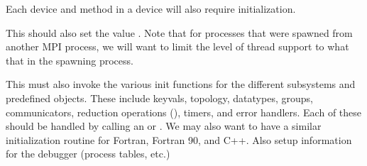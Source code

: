 \documentclass{article}
\begin{document}
Each device and method in a device will also require initialization.  


This should also set the value .
Note that for processes that were spawned from another MPI process, we will
want to limit the level of thread support to what that in the spawning
process. 

This must also invoke the various init functions for the different
subsystems and predefined objects.  These include keyvals, topology, datatypes,
groups, communicators, reduction operations (), timers, and error
handlers.  Each of these should be handled by calling an
 or .  We may also
want to have a similar initialization routine for Fortran, Fortran 90,
and C++.  
Also setup information for the debugger (process tables, etc.)
\end{document}
